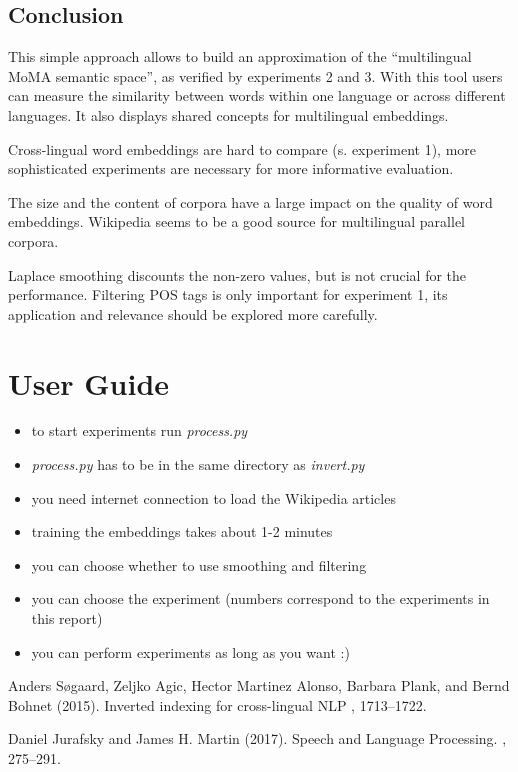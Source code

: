 \documentclass[a4paper]{article}
\begin{document}
\subsection{Conclusion}
This simple approach allows to build an approximation of the ``multilingual MoMA semantic space'', as verified by experiments 2 and 3. With this tool users can measure the similarity between words within one language or across different languages. It also displays shared concepts for multilingual embeddings. \par 
Cross-lingual word embeddings are hard to compare (s. experiment 1), more sophisticated experiments are necessary for more informative evaluation.\par
The size and the content of corpora have a large impact on the quality of word embeddings. Wikipedia seems to be a good source for multilingual parallel corpora. \par
Laplace smoothing discounts the non-zero values, but is not crucial for the performance. Filtering POS tags is only important for experiment 1, its application and relevance should be explored more carefully.\par
\section{User Guide}
\begin{itemize}
\item to start experiments run \textit{process.py}
\item \textit{process.py} has to be in the same directory as \textit{invert.py}
\item you need internet connection to load the Wikipedia articles
\item training the embeddings takes about 1-2 minutes
\item you can choose whether to use smoothing and filtering
\item you can choose the experiment (numbers correspond to the experiments in this report)
\item you can perform experiments as long as you want :)
\end{itemize}
 \newpage
\begin{thebibliography}{99} %

Anders S\o gaard, Zeljko Agic, Hector Martinez Alonso, Barbara Plank, and Bernd Bohnet (2015).
\newblock Inverted indexing for cross-lingual NLP
, 1713--1722.

Daniel Jurafsky and James H. Martin (2017).
\newblock Speech and Language Processing.
, 275--291.

 
\end{thebibliography}
\end{document}
